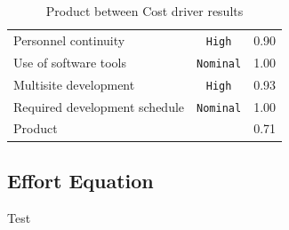 \begin{table}[h!]
\begin{tabular}{| p{8cm} | c | c |}
Personnel continuity                      & \texttt{High}      &  0.90    \\  
Use of software tools                     & \texttt{Nominal}   &  1.00    \\  
Multisite development                     & \texttt{High}      &  0.93    \\   
Required development schedule             & \texttt{Nominal}   &  1.00    \\ \hline
Product                                   &                    &  0.71    \\ \hline
\end{tabular}
\caption{Product between Cost driver results}
\label{tab:cocomo2}
\end{table}

\subsection{Effort Equation} %
\label{sub:effort_equation}

Test
